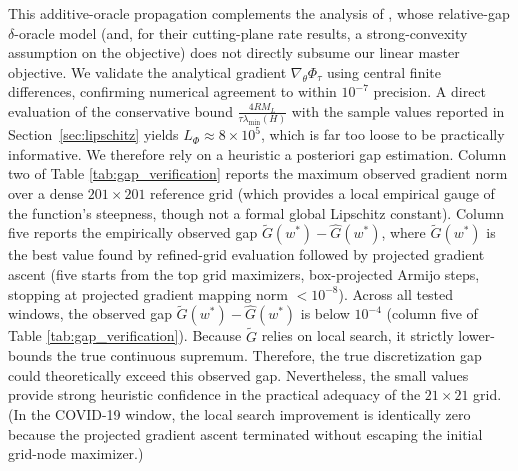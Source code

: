 \documentclass[smallcondensed]{svjour3}
\begin{document}
This additive-oracle propagation complements the analysis of \cite{oustry2025convex}, whose relative-gap $\delta$-oracle model (and, for their cutting-plane rate results, a strong-convexity assumption on the objective) does not directly subsume our linear master objective. We validate the analytical gradient $\nabla_\theta \Phi_\tau$ using central finite differences, confirming numerical agreement to within $10^{-7}$ precision. A direct evaluation of the conservative bound $\frac{4RM_L}{\tau\lambda_{\min}(H)}$ with the sample values reported in Section~\ref{sec:lipschitz} yields $L_\Phi \approx 8\times10^{5}$, which is far too loose to be practically informative. We therefore rely on a heuristic a posteriori gap estimation. Column two of Table \ref{tab:gap_verification} reports the maximum observed gradient norm over a dense $201\times201$ reference grid (which provides a local empirical gauge of the function's steepness, though not a formal global Lipschitz constant). Column five reports the empirically observed gap $\widetilde G(w^*) - \widehat G(w^*)$, where $\widetilde G(w^*)$ is the best value found by refined-grid evaluation followed by projected gradient ascent (five starts from the top grid maximizers, box-projected Armijo steps, stopping at projected gradient mapping norm $<10^{-8}$). Across all tested windows, the observed gap $\widetilde G(w^*) - \widehat G(w^*)$ is below $10^{-4}$ (column five of Table \ref{tab:gap_verification}). Because $\widetilde G$ relies on local search, it strictly lower-bounds the true continuous supremum. Therefore, the true discretization gap could theoretically exceed this observed gap. Nevertheless, the small values provide strong heuristic confidence in the practical adequacy of the $21\times21$ grid. (In the COVID-19 window, the local search improvement is identically zero because the projected gradient ascent terminated without escaping the initial grid-node maximizer.)

\begin{table}[!htbp]
\centering
\caption{A posteriori gap estimation for the robust discretization}
\label{tab:gap_verification}
\end{table}
\end{document}
